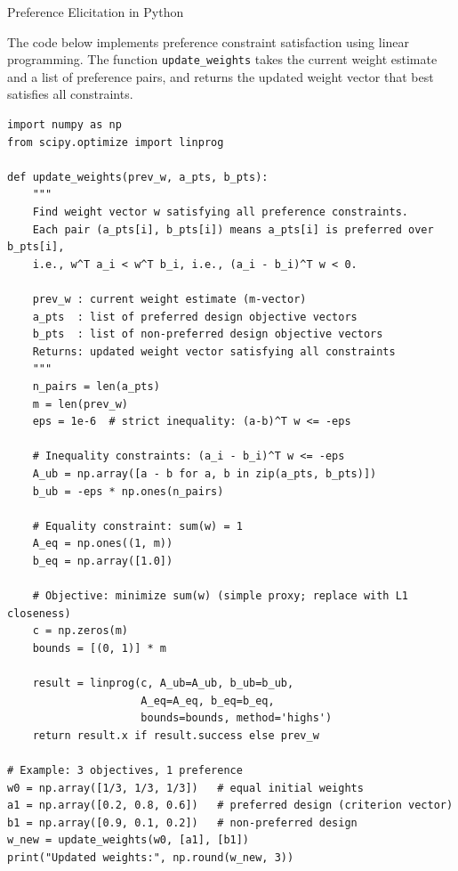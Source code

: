 \documentclass[aspectratio=169,10pt]{beamer}
\begin{document}
\begin{frame}[fragile]{Preference Elicitation in Python}

The code below implements preference constraint satisfaction using linear
programming.  The function \texttt{update\_weights} takes the current weight
estimate and a list of preference pairs, and returns the updated weight vector
that best satisfies all constraints.

\begin{lstlisting}
import numpy as np
from scipy.optimize import linprog

def update_weights(prev_w, a_pts, b_pts):
    """
    Find weight vector w satisfying all preference constraints.
    Each pair (a_pts[i], b_pts[i]) means a_pts[i] is preferred over b_pts[i],
    i.e., w^T a_i < w^T b_i, i.e., (a_i - b_i)^T w < 0.

    prev_w : current weight estimate (m-vector)
    a_pts  : list of preferred design objective vectors
    b_pts  : list of non-preferred design objective vectors
    Returns: updated weight vector satisfying all constraints
    """
    n_pairs = len(a_pts)
    m = len(prev_w)
    eps = 1e-6  # strict inequality: (a-b)^T w <= -eps

    # Inequality constraints: (a_i - b_i)^T w <= -eps
    A_ub = np.array([a - b for a, b in zip(a_pts, b_pts)])
    b_ub = -eps * np.ones(n_pairs)

    # Equality constraint: sum(w) = 1
    A_eq = np.ones((1, m))
    b_eq = np.array([1.0])

    # Objective: minimize sum(w) (simple proxy; replace with L1 closeness)
    c = np.zeros(m)
    bounds = [(0, 1)] * m

    result = linprog(c, A_ub=A_ub, b_ub=b_ub,
                     A_eq=A_eq, b_eq=b_eq,
                     bounds=bounds, method='highs')
    return result.x if result.success else prev_w

# Example: 3 objectives, 1 preference
w0 = np.array([1/3, 1/3, 1/3])   # equal initial weights
a1 = np.array([0.2, 0.8, 0.6])   # preferred design (criterion vector)
b1 = np.array([0.9, 0.1, 0.2])   # non-preferred design
w_new = update_weights(w0, [a1], [b1])
print("Updated weights:", np.round(w_new, 3))
\end{lstlisting}

\end{frame}
\end{document}
